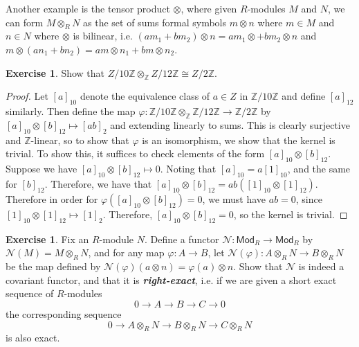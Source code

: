 \documentclass[psamsfonts]{amsart}
\theoremstyle{definition}
\newtheorem{exer}[thm]{Exercise}
\theoremstyle{remark}
\newcommand{\ib}[1]{\textbf{\textit{#1}}}
\newcommand{\Z}{\mathbb{Z}}
\begin{document}
%
Another example is the tensor product $\otimes$, where given $R$-modules $M$ and $N$, we can form $M \otimes_R N$ as the set of sums formal symbols $m \otimes n$ where $m \in M$ and $n \in N$ where $\otimes$ is bilinear, i.e. $(am_1 + bm_2) \otimes n = am_1 \otimes + bm_2 \otimes n$ and $m \otimes (an_1 + bn_2) = am\otimes n_1 + bm\otimes n_2$.
%
\begin{exer}
Show that $Z/10\Z \otimes_\Z Z/12\Z \cong Z/2\Z$.
\end{exer}
%
\begin{proof}
Let $[a]_{10}$ denote the equivalence class of $a \in Z$ in $\Z/10\Z$ and define $[a]_{12}$ similarly. Then define the map $\varphi: \Z/10\Z \otimes_\Z \Z/12\Z \to \Z/2\Z$ by $[a]_{10} \otimes [b]_{12} \mapsto [ab]_2$ and extending linearly to sums. This is clearly surjective and $\Z$-linear, so to show that $\varphi$ is an isomorphism, we show that the kernel is trivial. To show this, it suffices to check elements of the form $[a]_{10} \otimes [b]_{12}$. Suppose we have $[a]_{10} \otimes [b]_{12} \mapsto 0$. Noting that $[a]_{10} = a[1]_{10}$, and the same for $[b]_{12}$. Therefore, we have that $[a]_{10} \otimes [b]_{12} = ab([1]_{10} \otimes [1]_{12})$. Therefore in order for $\varphi([a]_{10} \otimes [b]_{12}) = 0$, we must have $ab = 0$, since $[1]_{10} \otimes [1]_{12} \mapsto [1]_2$. Therefore, $[a]_{10} \otimes [b]_{12} = 0$, so the kernel is trivial.
\end{proof}
%
\begin{exer}
Fix an $R$-module $N$. Define a functor $\mathcal{N}: \mathsf{Mod}_R \to \mathsf{Mod}_R$ by $\mathcal{N}(M) = M \otimes_R N$, and for any map $\varphi : A \to B$, let $\mathcal{N}(\varphi) : A\otimes_R N \to B\otimes_R N$ be the map defined by $\mathcal{N}(\varphi)(a \otimes n) = \varphi(a) \otimes n$. Show that $\mathcal{N}$ is indeed a covariant functor, and that it is \ib{right-exact}, i.e. if we are given a short exact sequence of $R$-modules
$$0 \to A \to B \to C \to 0 $$
the corresponding sequence
$$0 \to A \otimes_R N \to B \otimes_R N \to C \otimes_R N $$
is also exact.
\end{exer}
%
\end{document}
